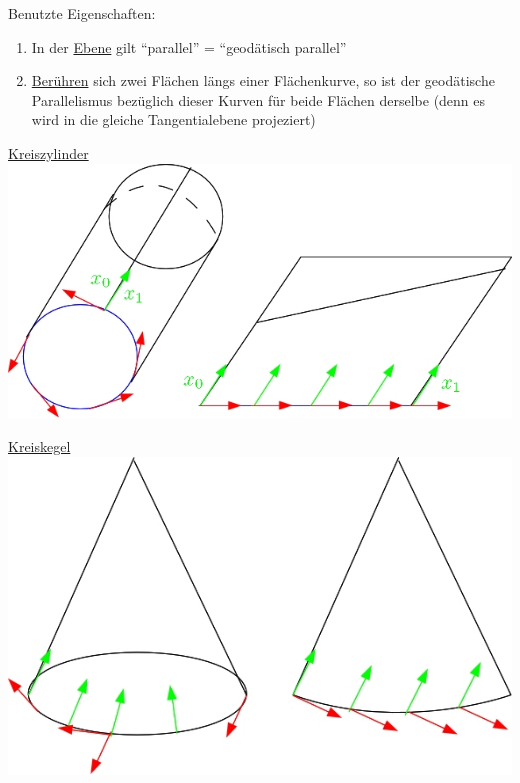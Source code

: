 \begin{bsp}
 Benutzte Eigenschaften:
 \begin{enumerate}
  \item In der \uline{Ebene} gilt ``parallel'' = ``geodätisch parallel''
  \item \uline{Berühren} sich zwei Flächen längs einer Flächenkurve, so ist der geodätische Parallelismus bezüglich dieser Kurven für beide Flächen derselbe (denn es wird in die gleiche Tangentialebene projeziert)
 \end{enumerate}
\uline{Kreiszylinder} \includegraphics[scale=0.2]{Bilder/Bsp9} \par
\uline{Kreiskegel} \includegraphics[scale=0.2]{Bilder/Bsp10} \par

\end{bsp}
